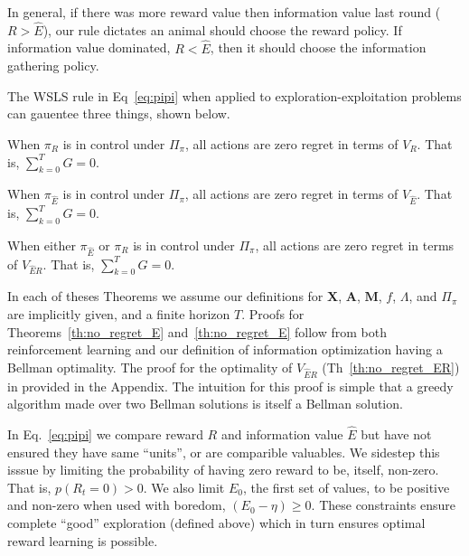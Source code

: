 In general, if there was more reward value then information value last round ($R > \hat E$), our rule dictates an animal should choose the reward policy. If information value dominated, $R < \hat E$, then it should choose the information gathering policy.

The WSLS rule in Eq~\ref{eq:pipi} when applied to exploration-exploitation problems can gauentee three things, shown below. 

\begin{theorem}
	\label{th:no_regret_R}
	When $\pi_R$ is in control under $\Pi_{\pi}$, all actions are zero regret in terms of $V_R$. That is, $\sum_{k=0}^{T} G = 0$.
\end{theorem}

\begin{theorem}
	\label{th:no_regret_E}
	When $\pi_{\hat E}$ is in control under $\Pi_{\pi}$, all actions are zero regret in terms of $V_{\hat E}$. That is, $\sum_{k=0}^{T} G = 0$.
\end{theorem}

\begin{theorem}
	\label{th:no_regret_ER}
	When either $\pi_{\hat E}$ or $\pi_R$ is in control under $\Pi_{\pi}$, all actions are zero regret in terms of $V_{\hat{E}R}$. That is, $\sum_{k=0}^{T} G = 0$.
\end{theorem}

In each of theses Theorems we assume our definitions for $\mathbf{X}$, $\mathbf{A}$, $\mathbf{M}$, $f$, $\Lambda$, and $\Pi_{\pi}$ are implicitly given, and a finite horizon $T$. Proofs for Theorems~\ref{th:no_regret_E} and~\ref{th:no_regret_E} follow from both reinforcement learning and our definition of information optimization having a Bellman optimality. The proof for the optimality of $V_{\hat{E}R}$ (Th~\ref{th:no_regret_ER}) in provided in the Appendix. The intuition for this proof is simple that a greedy algorithm made over two Bellman solutions is itself a Bellman solution.

In Eq.~\ref{eq:pipi} we compare reward $R$ and information value $\hat E$ but have not ensured they have same ``units'', or are comparible valuables. We sidestep this isssue by limiting the probability of having zero reward to be, itself, non-zero. That is, $p(R_t=0) > 0$. We also limit $E_0$, the first set of values, to be positive and non-zero when used with boredom, $(E_0 - \eta) \geq 0$. These constraints ensure complete ``good'' exploration (defined above) which in turn ensures optimal reward learning is possible.


